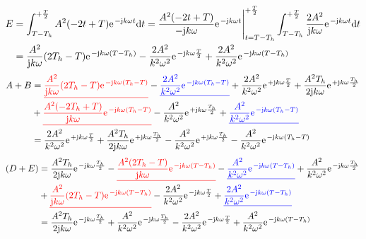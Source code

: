 \documentclass[11pt,a4paper,DIV=12]{scrartcl}
\newcommand{\ured}[1]{\textcolor{red}{\underline{#1}}}
\newcommand{\ublue}[1]{\textcolor{blue}{\underline{#1}}}
\newcommand{\diff}{\mathrm{d}}
\begin{document}
%
%
%
\begin{align}
	E&=\int_{T-T_h}^{+\frac{T}{2}}A^2(-2t+T)\e^{-\im k \omega t}\diff t=\frac{A^2(-2t+T)}{-\im k \omega}\e^{-\im k \omega t}\Bigg |_{t=T-T_h}^{+\frac{T}{2}}\int_{T-T_h}^{+\frac{T}{2}}\frac{2A^2}{\im k \omega}\e^{-\im k \omega t}\diff t\nonumber \\
	&=\frac{A^2}{\im k \omega}(2T_h-T)\e^{-\im k \omega (T-T_h)}-\frac{2A^2}{k^2\omega^2}\e^{-\im k \omega \frac{T}{2}}+\frac{2A^2}{k^2\omega^2}\e^{-\im k \omega (T-T_h)}
\end{align}
%
%
%
\begin{align}
	A+B&=\ured{\frac{A^2}{\im k \omega}(2T_h-T)\e^{-\im k \omega (T_h-T)}}-\ublue{\frac{2A^2}{k^2\omega^2}\e^{-\im k \omega (T_h-T)}}+\frac{2A^2}{k^2\omega^2}\e^{+\im k \omega \frac{T}{2}}+\frac{A^2T_h}{2\im k \omega}\e^{+\im k \omega \frac{T_h}{2}}\nonumber \\
	&+\ured{\frac{A^2(-2T_h+T)}{\im k \omega}\e^{-\im k \omega (T_h-T)}}-\frac{A^2}{k^2\omega^2}\e^{+\im k \omega \frac{T_h}{2}}+\ublue{\frac{A^2}{k^2\omega^2}\e^{-\im k \omega (T_h-T)}}\nonumber \\
	&=\frac{2A^2}{k^2\omega^2}\e^{+\im k \omega \frac{T}{2}}+\frac{A^2T_h}{2\im k \omega}\e^{+\im k \omega \frac{T_h}{2}}-\frac{A^2}{k^2\omega^2}\e^{+\im k \omega\frac{T_h}{2}}-\frac{A^2}{k^2\omega^2}\e^{-\im k \omega (T_h-T)}
\end{align}
%
%
%
\begin{align}
	(D+E)&=\frac{A^2T_h}{2\im k \omega}\e^{-\im k \omega \frac{T_h}{2}}-\ured{\frac{A^2(2T_h-T)}{\im k \omega}\e^{-\im k \omega (T-T_h)}}-\ublue{\frac{A^2}{k^2\omega^2}\e^{-\im k \omega (T-T_h)}}+\frac{A^2}{ k^2 \omega^2}\e^{-\im k \omega \frac{T_h}{2}}\nonumber \\
	&+\ured{\frac{A^2}{\im k \omega}(2T_h-T)\e^{-\im k \omega (T-T_h)}}-\frac{2A^2}{k^2\omega^2}\e^{-\im k \omega \frac{T}{2}}+\ublue{\frac{2A^2}{k^2\omega^2}\e^{-\im k \omega (T-T_h)}}\nonumber\\
	&=\frac{A^2T_h}{2\im k \omega}\e^{-\im k \omega \frac{T_h}{2}}+\frac{A^2}{ k^2 \omega^2}\e^{-\im k \omega \frac{T_h}{2}}-\frac{2A^2}{k^2\omega^2}\e^{-\im k \omega \frac{T}{2}}+\frac{A^2}{k^2\omega^2}\e^{-\im k \omega (T-T_h)}
\end{align}
%
%
%
\end{document}
